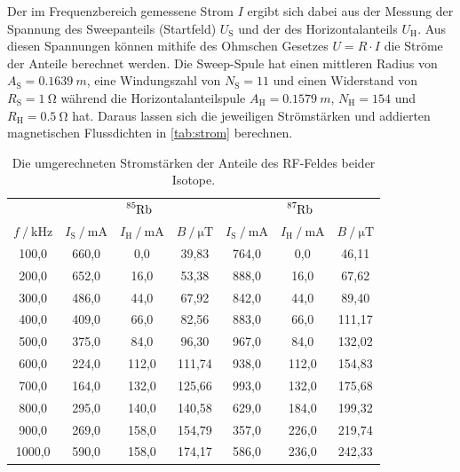 Der im Frequenzbereich gemessene Strom $I$ ergibt sich dabei aus der Messung der Spannung des Sweepanteils (Startfeld) $U_\text{S}$
und der des Horizontalanteils $U_\text{H}$.
Aus diesen Spannungen können mithife des Ohmschen Gesetzes $U = R \cdot I$ die Ströme der Anteile berechnet werden.
Die Sweep-Spule hat einen mittleren Radius von $A_\text{S} = \qty{0.1639}{m}$,
eine Windungszahl von $N_\text{S} = 11$
und einen Widerstand von  $R_\text{S} = \qty{1}{\ohm}$
während die Horizontalanteilspule $A_\text{H} = \qty{0.1579}{m}$, $N_\text{H} = 154$ und $R_\text{H} = \qty{0.5}{\ohm}$ hat.
Daraus lassen sich die jeweiligen Strömstärken und addierten magnetischen Flussdichten in \autoref{tab:strom} berechnen.
\begin{table}
    \centering
    \caption{Die umgerechneten Stromstärken der Anteile des RF-Feldes beider Isotope.}
    \label{tab:strom}
    \begin{tabular}{c c c c c c c}
        \toprule 
        & \multicolumn{3}{c}{$\ce{^{85}_{}Rb}$} &
        \multicolumn{3}{c}{$\ce{^{87}_{}Rb}$} \\
        \cmidrule(lr){2-4}\cmidrule(lr){5-7}
    
        $f \mathbin{/} \mathrm{kHz}$ &
        $I_\text{S} \mathbin{/} \unit{\milli\ampere}$ &
        $I_\text{H} \mathbin{/} \unit{\milli\ampere}$ &
        $B \mathbin{/} \unit{\micro\tesla}$ &
        $I_\text{S} \mathbin{/} \unit{\milli\ampere}$ & 
        $I_\text{H} \mathbin{/} \unit{\milli\ampere}$ &
        $B \mathbin{/} \unit{\micro\tesla}$ \\
        \midrule
        100,0 &   660,0 &      0,0 &      39,83 &   764,0 &      0,0 &      46,11 \\
        200,0 &   652,0 &     16,0 &      53,38 &   888,0 &     16,0 &      67,62 \\
        300,0 &   486,0 &     44,0 &      67,92 &   842,0 &     44,0 &      89,40 \\
        400,0 &   409,0 &     66,0 &      82,56 &   883,0 &     66,0 &     111,17 \\
        500,0 &   375,0 &     84,0 &      96,30 &   967,0 &     84,0 &     132,02 \\
        600,0 &   224,0 &    112,0 &     111,74 &   938,0 &    112,0 &     154,83 \\
        700,0 &   164,0 &    132,0 &     125,66 &   993,0 &    132,0 &     175,68 \\
        800,0 &   295,0 &    140,0 &     140,58 &   629,0 &    184,0 &     199,32 \\
        900,0 &   269,0 &    158,0 &     154,79 &   357,0 &    226,0 &     219,74 \\
       1000,0 &   590,0 &    158,0 &     174,17 &   586,0 &    236,0 &     242,33 \\
        \bottomrule
    \end{tabular}        
\end{table}

